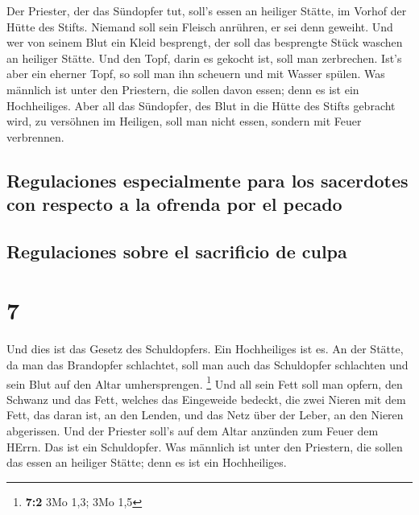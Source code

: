  Der Priester, der das Sündopfer tut, soll's essen an
heiliger Stätte, im Vorhof der Hütte des Stifts.  Niemand
soll sein Fleisch anrühren, er sei denn geweiht. Und wer von seinem Blut
ein Kleid besprengt, der soll das besprengte Stück waschen an heiliger
Stätte.  Und den Topf, darin es gekocht ist, soll man
zerbrechen. Ist's aber ein eherner Topf, so soll man ihn scheuern und
mit Wasser spülen.  Was männlich ist unter den Priestern,
die sollen davon essen; denn es ist ein Hochheiliges. 
Aber all das Sündopfer, des Blut in die Hütte des Stifts gebracht wird,
zu versöhnen im Heiligen, soll man nicht essen, sondern mit Feuer
verbrennen.

\hypertarget{regulaciones-especialmente-para-los-sacerdotes-con-respecto-a-la-ofrenda-por-el-pecado}{%
\subsection{Regulaciones especialmente para los sacerdotes con respecto
a la ofrenda por el
pecado}\label{regulaciones-especialmente-para-los-sacerdotes-con-respecto-a-la-ofrenda-por-el-pecado}}

\hypertarget{regulaciones-sobre-el-sacrificio-de-culpa}{%
\subsection{Regulaciones sobre el sacrificio de
culpa}\label{regulaciones-sobre-el-sacrificio-de-culpa}}

\hypertarget{section-6}{%
\section{7}\label{section-6}}

 Und dies ist das Gesetz des Schuldopfers. Ein
Hochheiliges ist es.  An der Stätte, da man das Brandopfer
schlachtet, soll man auch das Schuldopfer schlachten und sein Blut auf
den Altar umhersprengen. \footnote{\textbf{7:2} 3Mo 1,3; 3Mo 1,5}
 Und all sein Fett soll man opfern, den Schwanz und das
Fett, welches das Eingeweide bedeckt,  die zwei Nieren mit
dem Fett, das daran ist, an den Lenden, und das Netz über der Leber, an
den Nieren abgerissen.  Und der Priester soll's auf dem
Altar anzünden zum Feuer dem HErrn. Das ist ein Schuldopfer.
 Was männlich ist unter den Priestern, die sollen das
essen an heiliger Stätte; denn es ist ein Hochheiliges.


